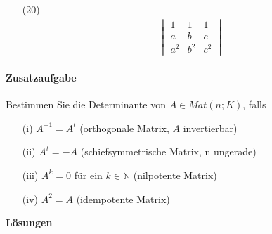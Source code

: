 \documentclass[11pt]{report}
\newcommand*\Zb[1] {\mathbb{#1}}
\newcommand*\f[1] {\textbf{#1}}
\begin{document}
\begin{itemize}
\item[(20)] 
\begin{align}
\begin{vmatrix}
1 & 1 & 1 \\
a & b & c \\
a^2 & b^2 & c^2
\end{vmatrix}
\end{align}
\end{itemize}

\paragraph{Zusatzaufgabe}
Bestimmen Sie die Determinante von $A \in Mat(n;K)$, falls
\begin{itemize}
\item[(i)] $A^{-1} = A^t$ (orthogonale Matrix, $A$ invertierbar)
\item[(ii)] $A^t = -A$ (schiefsymmetrische Matrix, n ungerade)
\item[(iii)] $A^k = 0$ für ein $k \in \Zb{N}$ (nilpotente Matrix)
\item[(iv)] $A^2 = A$ (idempotente Matrix)
\end{itemize}

\newpage
\Large \f{Lösungen} \normalsize
\end{document}
